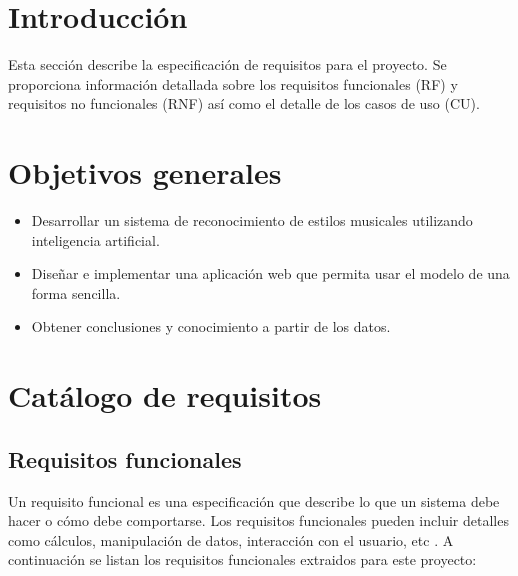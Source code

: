
\section{Introducción}

Esta sección describe la especificación de requisitos para el proyecto. Se proporciona información detallada sobre los requisitos funcionales (RF) y requisitos no funcionales (RNF) así como el detalle de los casos de uso (CU).

\section{Objetivos generales}

\begin{itemize}
\tightlist
\item Desarrollar un sistema de reconocimiento de estilos musicales utilizando inteligencia artificial.
\item Diseñar e implementar una aplicación web que permita usar el modelo de una forma sencilla.
\item Obtener conclusiones y conocimiento a partir de los datos.
\end{itemize}

\section{Catálogo de requisitos}

\subsection{Requisitos funcionales}

Un requisito funcional es una especificación que describe lo que un sistema debe hacer o cómo debe comportarse.
Los requisitos funcionales pueden incluir detalles como cálculos, manipulación de datos, interacción con el usuario, etc \cite{Blog_2018}.
A continuación se listan los requisitos funcionales extraidos para este proyecto:

